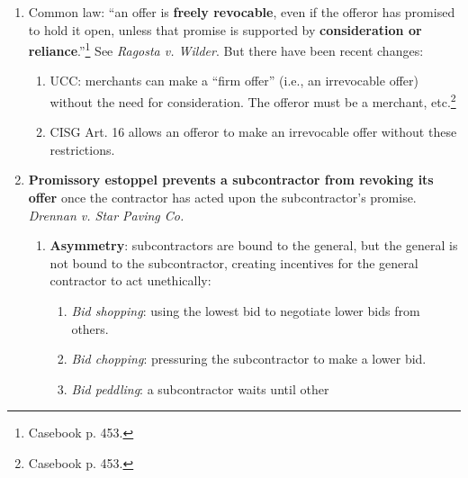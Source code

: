 \begin{enumerate}
\begin{enumerate}
\begin{enumerate}
            the interests of offerors as a class.\footnote{Casebook pp. 
            446--47.}
            \item So, the Restatement (First) drew a distinction between 
            \textbf{performing} and \textbf{preparing to perform}, which the 
            court followed in \emph{Ragosta v. Wilder}. But the distinction 
            can be hard to justify. For instance, say the unilateral offer is 
            that I'll give you \$1,000 to cross the Brooklyn Bridge. If you 
            take one step on the bridge, there is a contract. But if you spend 
            hours preparing, there is no contract.
        \end{enumerate}
        \item Common law: ``an offer is \textbf{freely revocable}, even if the 
        offeror has promised to hold it open, unless that promise is supported 
        by \textbf{consideration or reliance}.''\footnote{Casebook p. 453.} 
        See \emph{Ragosta v. Wilder}. But there have been recent changes:
        \begin{enumerate}
            \item UCC: merchants can make a ``firm offer'' (i.e., an 
            irrevocable offer) without the need for consideration. The offeror 
            must be a merchant, etc.\footnote{Casebook p. 453.}
            \item CISG Art. 16 allows an offeror to make an irrevocable offer 
            without these restrictions.
        \end{enumerate}
        \item \textbf{Promissory estoppel prevents a subcontractor from 
        revoking its offer} once the contractor has acted upon the 
        subcontractor's promise.  \emph{Drennan v. Star Paving Co.}
        \begin{enumerate}
            \item \textbf{Asymmetry}: subcontractors are bound to the general, 
            but the general is not bound to the subcontractor, creating 
            incentives for the general contractor to act unethically:
            \begin{enumerate}
                \item \emph{Bid shopping}: using the lowest bid to negotiate 
                lower bids from others.
                \item \emph{Bid chopping}: pressuring the subcontractor to 
                make a lower bid.
                \item \emph{Bid peddling}: a subcontractor waits until other 

\end{enumerate}
\end{enumerate}
\end{enumerate}
\end{enumerate}
